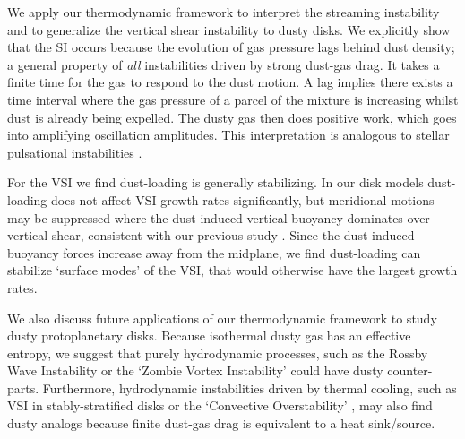 We  apply our thermodynamic framework to interpret
the streaming instability \citep[SI, ][]{youdin05a,jacquet11} and to generalize the vertical shear
instability \citep[VSI, ][]{nelson13,lin15} to dusty disks. We
explicitly show that the SI occurs because the evolution of gas
pressure lags behind  dust density; a general property of \emph{all}
instabilities driven by strong dust-gas drag. 
It takes a finite time for the gas to respond to
the dust motion. A lag implies there exists a time interval where 
the gas pressure of a parcel of the mixture is increasing whilst dust is already being expelled.  
The dusty gas then does positive work, which goes into amplifying
oscillation amplitudes. This interpretation is analogous to stellar pulsational
instabilities \citep{cox67}. 

For the VSI we find dust-loading is generally stabilizing. In our disk models 
dust-loading does not affect VSI growth rates significantly, but
meridional motions may be suppressed where the dust-induced
vertical buoyancy dominates over vertical shear, consistent with our
previous study \citep{lin15}. Since the dust-induced buoyancy forces increase away from the midplane, we find dust-loading can stabilize `surface modes' of the VSI, that would otherwise have the largest growth rates.  

We also discuss future applications of our thermodynamic framework to 
study dusty protoplanetary disks. Because isothermal dusty gas has an
effective entropy, we suggest that purely hydrodynamic processes, such
as the Rossby Wave Instability \citep{li00} or the `Zombie Vortex
Instability' \citep{marcus15} could have dusty counter-parts.   
Furthermore, hydrodynamic instabilities driven by thermal cooling, such as VSI in
stably-stratified disks \citep{lin15} or the `Convective
Overstability' \citep{klahr14, lyra14},  may also find dusty analogs 
because finite dust-gas drag is equivalent to a heat sink/source. 






 
